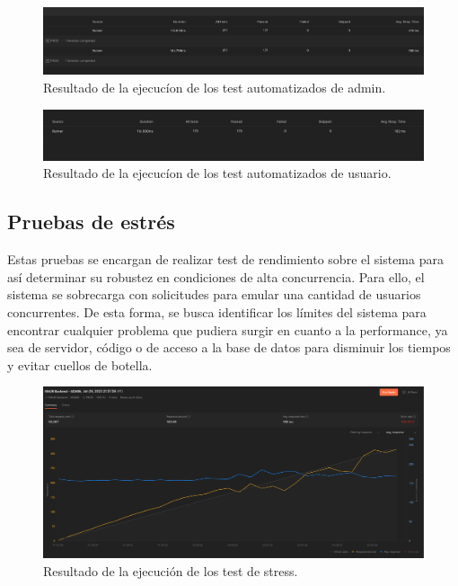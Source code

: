 \begin{figure}[h]
    \centering
    \includegraphics[width=1.0\textwidth]{img/manual/test_admin.png}
    \caption{Resultado de la ejecucíon de los test automatizados de admin.} \label{Img:Resultado+de+test+admin}
\end{figure} 

\begin{figure}[h]
    \centering
    \includegraphics[width=1.1\textwidth]{img/manual/test_usuario.png}
    \caption{Resultado de la ejecucíon de los test automatizados de usuario.} \label{Img:Resultado+de+test+usuario}
\end{figure} 
\newpage
\subsection{Pruebas de estrés}
Estas pruebas se encargan de realizar test de rendimiento sobre el sistema para así determinar su robustez en condiciones de alta concurrencia. Para ello, el sistema se sobrecarga con solicitudes para emular una cantidad de usuarios concurrentes.
De esta forma, se busca identificar los límites del sistema para encontrar cualquier problema que pudiera surgir en cuanto a la performance, ya sea de servidor, código o de acceso a la base de datos para disminuir los tiempos y evitar cuellos de botella.
\begin{figure}[h]
    \centering
    \includegraphics[width=1.0\textwidth]{img/manual/test_de_stress.png}
    \caption{Resultado de la ejecución de los test de stress.} \label{Img:Resultado+de+test+stress}
\end{figure} 



